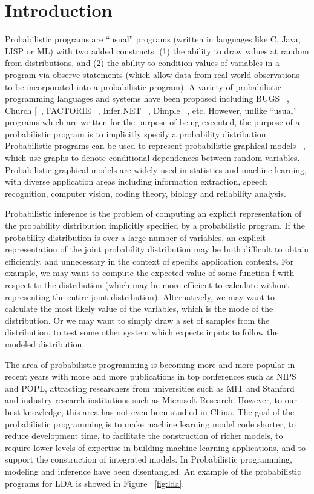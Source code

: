 \chapter{Introduction}
\label{chap:intro}
Probabilistic programs are “usual” programs (written in languages like C, Java, LISP or ML) with two added constructs: (1) the ability to draw values at random from distributions, and (2) the ability to condition values of variables in a program via observe statements (which allow data from real world observations to be incorporated into a probabilistic program). A variety of probabilistic programming languages and systems have been proposed including BUGS ~\cite{bugs}, Church [~\cite{church}, FACTORIE ~\cite{factorie}, Infer.NET ~\cite{infernet}, Dimple ~\cite{dimple}, etc. However, unlike “usual” programs which are written for the purpose of being executed, the purpose of a probabilistic program is to implicitly specify a probability distribution. Probabilistic programs can be used to represent probabilistic graphical models ~\cite{pgm}, which use graphs to denote conditional dependences between random variables. Probabilistic graphical models are widely used in statistics and machine learning, with diverse application areas including information extraction, speech recognition, computer vision, coding theory, biology and reliability analysis.

Probabilistic inference is the problem of computing an explicit representation of the probability distribution implicitly specified by a probabilistic program. If the probability distribution is over a large number of variables, an explicit representation of the joint probability distribution may be both difficult to obtain efficiently, and unnecessary in the context of specific application contexts. For example, we may want to compute the expected value of some function f with respect to the distribution (which may be more efficient to calculate without representing the entire joint distribution). Alternatively, we may want to calculate the most likely value of the variables, which is the mode of the distribution. Or we may want to simply draw a set of samples from the distribution, to test some other system which expects inputs to follow the modeled distribution.

The area of probabilistic programming is becoming more and more popular in recent years with more and more publications in top conferences such as NIPS and POPL, attracting researchers from universities such as MIT and Stanford and industry research institutions such as Microsoft Research. However, to our best knowledge, this area has not even been studied in China. 
The goal of the probabilistic programming is to make machine learning model code shorter, to reduce development time, to facilitate the construction of richer models, to require lower levels of expertise in building machine learning applications, and to support the construction of integrated models. In Probabilistic programming, modeling and inference have been disentangled. An example of the probabilistic programs for LDA is showed in Figure ~\ref{fig:lda}.


